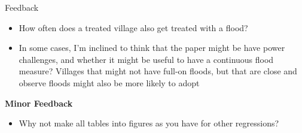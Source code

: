 \documentclass{beamer}
\begin{document}
\begin{frame}{Feedback}

\begin{itemize}
    \item How often does a treated village also get treated with a flood?
    \item In some cases, I'm inclined to think that the paper might be have power challenges, and whether it might be useful to have a continuous flood measure? Villages that might not have full-on floods, but that are close and observe floods might also be more likely to adopt
\end{itemize}

\textbf{Minor Feedback}
    \begin{itemize}
        \item Why not make all tables into figures as you have for other regressions?
    \end{itemize}
\end{frame}



\end{document}
